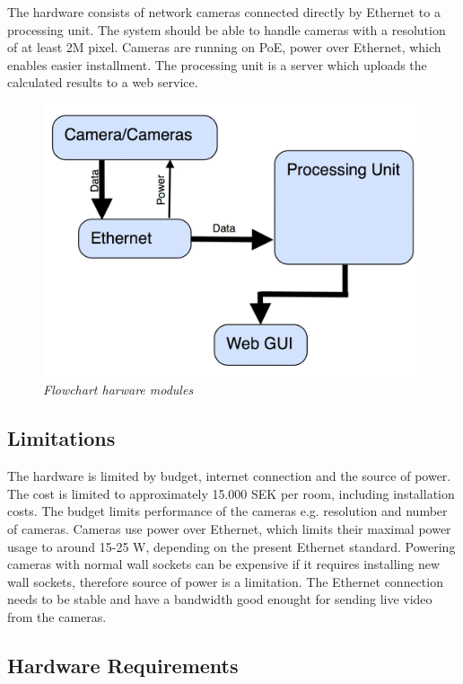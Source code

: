 

The hardware consists of network cameras connected directly by Ethernet to a processing unit. The system should be able to handle cameras with a resolution of at least 2M pixel. Cameras are running on PoE, power over Ethernet, which enables easier installment. 
The processing unit is a server which uploads the calculated results to a web service. 

\begin{figure}[htb]
	\centering
	\includegraphics[width=160mm]{images/Hardware-flowchart.jpg}
	\caption[This text ends up at the list of figures]{\textit{Flowchart harware modules}}
	\label{fig:block_overview_fig}  %
\end{figure}


\subsection{Limitations}
The hardware is limited by budget, internet connection and the source of power. The cost is limited to approximately 15.000 SEK per room, including installation costs. The budget limits performance of the cameras e.g. resolution and number of cameras. Cameras use power over Ethernet, which limits their maximal power usage to around 15-25 W, depending on the present Ethernet standard. Powering cameras with normal wall sockets can be expensive if it requires installing new wall sockets, therefore source of power is a limitation. The Ethernet connection needs to be stable and have a bandwidth good enought for sending live video from the cameras.   

\subsection{Hardware Requirements}
\label{sec:hardware_req}
\reqtable
{
}